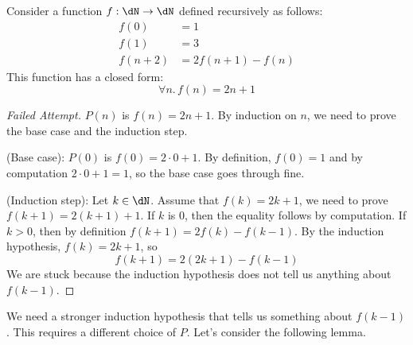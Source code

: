 \documentclass{amsart}
\begin{document}
\begin{prop}\label{prop:recurrence}
  Consider a function $f : \dN \to \dN$ defined recursively as follows:
  \begin{align}
    f(0) &= 1\\
    f(1) &= 3\\
    f(n+2) &= 2f(n + 1) - f(n)
  \end{align}
  This function has a closed form:
  \[
    \forall n.\,f(n) = 2n + 1
  \]
\end{prop}
\begin{proof}[Failed Attempt]
  $P(n)$ is $f(n) = 2n + 1$.
  By induction on $n$, we need to prove the base case and the induction step.

  (Base case): $P(0)$ is $f(0) = 2 \cdot 0 + 1$.
  By definition, $f(0) = 1$ and by computation $2 \cdot 0 + 1 = 1$, so the base case goes through fine.

  (Induction step): Let $k \in \dN$.
  Assume that $f(k) = 2k + 1$, we need to prove $f(k+1) = 2(k+1) + 1$.
  If $k$ is $0$, then the equality follows by computation.
  If $k > 0$, then by definition $f(k + 1) = 2f(k) - f(k - 1)$.
  By the induction hypothesis, $f(k) = 2k + 1$, so
  \[
    f(k + 1) = 2(2k + 1) - f(k - 1)
  \]
  We are stuck because the induction hypothesis does not tell us anything about $f(k - 1)$.
\end{proof}

We need a stronger induction hypothesis that tells us something about $f(k - 1)$.
This requires a different choice of $P$.
Let's consider the following lemma.
\end{document}
